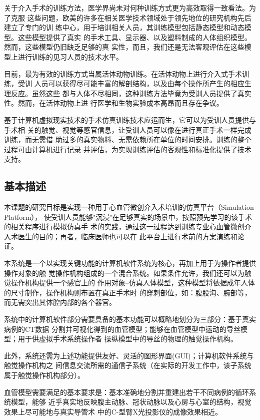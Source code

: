 关于介入手术的训练方法，医学界尚未对何种训练方式更为高效取得一致看法。为了克服
这些问题，欧美的许多在相关医学技术领域处于领先地位的研究机构先后建立了专门的训
练中心，用于培训相关人员，其训练模型包括静态模型和动态模型。这些模型提供了真实
的手术工具、显示器、以及塑料制成的人体组织模型。然而，这些模型仍旧缺乏足够的真
实性，而且，我们还是无法客观评估在这些模型上进行训练的见习人员的技术水平。

目前，最为有效的训练方式当属活体动物训练。在活体动物上进行介入式手术训练，受训
人员可以获得尽可能丰富的解剖结构，以及由每个操作所产生的相应生理反应。虽然这些
都与人体不尽相同，这种训练方法毕竟为受训人员提供了真实性。然而，在活体动物上进
行医学和生物实验成本高昂而且存在争议。

基于计算机虚拟现实技术的手术仿真训练技术应运而生，它可以为受训人员提供与手术相
关的触觉、视觉等感官信息，让受训人员可以像在进行真正手术一样完成训练，而无需借
助过多的真实物料、无需依赖所在单位的时间安排。训练的整个过程可由计算机进行记录
并评估，为实现训练评估的客观性和标准化提供了技术支持。

\subsection{基本描述}
\label{subsec1-1-2}

本课题的研究目标是实现一种用于心血管微创介入术培训的仿真平台（Simulation Platform），
使受训人员能够"沉浸"在足够真实的场景中，按照预先学习的该手术的相关程序进行模拟仿真手
术的实践，通过这一过程达到训练专业心血管微创介入术医生的目的；再者，临床医师也可以在
此平台上进行术前的方案演练和论证。

本系统是一个以实现关键功能的计算机软件系统为核心，再加上用于为操作者提供操作对象的触
觉操作机构组成的一个混合系统。如果条件允许，我们还可以为触觉操作机构提供一个感官上的
作用对象--仿真人体模型，这种模型将依据成年人体的尺寸制作，操作机构则布置在真正手术时
的穿刺部位，如：腹股沟、腕部等，而无需突出其体腔内部的各个器官。

系统中的计算机软件部分需要具备的基本功能可以概略地划分为三部分：基于真实病例的CT数据
分割并可视化得到的血管模型；能够在血管模型中运动的导丝模型；用于供虚拟手术系统操作者
操纵模型中的导丝的物理的触觉操作机构。

此外，系统还需为上述功能提供友好、灵活的图形界面(GUI)；计算机软件系统与触觉操作机构之
间信息交流所需的通信子系统（在实际的开发工作中，该子系统属于触觉操作机构部分）。

血管模型需要满足的基本要求是：基本准确地分割并重建出若干不同病例的循环系统模型，能够
近乎真实地反映腹主动脉、冠状动脉以及心房与心室的结构，视觉效果上尽可能地与真实导管术
中的C-型臂X光投影仪的成像效果相近。

